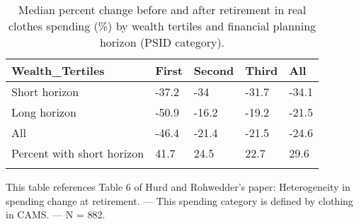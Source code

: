 \begin{table}[tbp] \centering
{}

\caption{Median percent change before and after retirement in real clothes spending (\%) by wealth tertiles and financial planning horizon (PSID category).}
\begin{tabularx}{\textwidth}{lCCCC}

\toprule
{Wealth\_Tertiles}&{First}&{Second}&{Third}&{All} \tabularnewline
\midrule\addlinespace[1.5ex]
Short horizon&-37.2&-34&-31.7&-34.1 \tabularnewline
Long horizon&-50.9&-16.2&-19.2&-21.5 \tabularnewline
All&-46.4&-21.4&-21.5&-24.6 \tabularnewline
Percent with short horizon&41.7&24.5&22.7&29.6 \tabularnewline
\bottomrule \addlinespace[1.5ex]

\end{tabularx}
\begin{flushleft}
\footnotesize This table references Table 6 of Hurd and Rohwedder's paper: Heterogeneity in spending change at retirement. \linebreak --- \linebreak This spending category is defined by clothing in CAMS. \linebreak --- \linebreak N = 882.
\end{flushleft}
\end{table}
